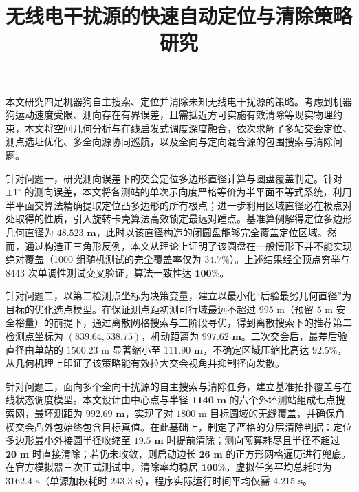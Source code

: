 \documentclass[zihao=-4,a4paper,UTF8]{ctexart}
\title{无线电干扰源的快速自动定位与清除策略研究}
\begin{document}
\maketitle

\begin{cumcmabstract}
\vspace{-0.7em}
\linespread{1.06}\selectfont
本文研究四足机器狗自主搜索、定位并清除未知无线电干扰源的策略。考虑到机器狗运动速度受限、测向存在有界误差，且需抵近方可实施有效清除等现实物理约束，本文将空间几何分析与在线启发式调度深度融合，依次求解了多站交会定位、测点选址优化、多全向源协同巡航，以及全向与定向混合源的包围搜索与清除问题。

针对问题一，研究测向误差下的交会定位多边形直径计算与圆盘覆盖判定。针对 $\pm 1^\circ$ 的测向误差，本文将各测站的单次示向度严格等价为半平面不等式系统，利用半平面交算法精确提取定位凸多边形的所有极点；进一步利用区域直径必在极点对处取得的性质，引入旋转卡壳算法高效锁定最远对踵点。基准算例解得定位多边形几何直径为 $\mathbf{48.523\text{ m}}$，此时以该直径构造的闭圆盘能够完全覆盖定位区域。然而，通过构造正三角形反例，本文从理论上证明了该圆盘在一般情形下并不能实现绝对覆盖（1000 组随机测试的完全覆盖率仅为 $\mathbf{34.7\%}$）。上述结果经全顶点穷举与 8443 次单调性测试交叉验证，算法一致性达 $\mathbf{100\%}$。

针对问题二，以第二检测点坐标为决策变量，建立以最小化“后验最劣几何直径”为目标的优化选点模型。在保证测点距初测可行域最远不超过 $995\text{ m}$（预留 $5\text{ m}$ 安全裕量）的前提下，通过离散网格搜索与三阶段寻优，得到离散搜索下的推荐第二检测点坐标为 $\mathbf{(839.64, 538.75)}$，机动距离为 $\mathbf{997.62\text{ m}}$。二次交会后，最差后验直径由单站的 $1500.23\text{ m}$ 显著缩小至 $\mathbf{111.90\text{ m}}$，不确定区域压缩比高达 $\mathbf{92.5\%}$，从几何机理上印证了该策略能有效拉大交会视角并抑制径向发散。

针对问题三，面向多个全向干扰源的自主搜索与清除任务，建立基准拓扑覆盖与在线状态调度模型。本文设计由中心点与半径 $\mathbf{1140\text{ m}}$ 的六个外环测站组成七点搜索网，最坏测距为 $\mathbf{992.69\text{ m}}$，实现了对 $1800\text{ m}$ 目标圆域的无缝覆盖，并确保角楔交会凸外包始终包含目标真值。在此基础上，制定了严格的分层清除判据：定位多边形最小外接圆半径收缩至 $\mathbf{19.5\text{ m}}$ 时提前清除；测向预算耗尽且半径不超过 $\mathbf{20\text{ m}}$ 时直接清除；若仍未收敛，则启动边长 $\mathbf{26\text{ m}}$ 的正方形网格遍历进行兜底。在官方模拟器三次正式测试中，清除率均稳居 $\mathbf{100\%}$，虚拟任务平均总耗时为 $\mathbf{3162.4\text{ s}}$（单源加权耗时 $\mathbf{243.3\text{ s}}$），程序实际运行时间平均仅需 $\mathbf{4.215\text{ s}}$。


\end{cumcmabstract}
\end{document}
